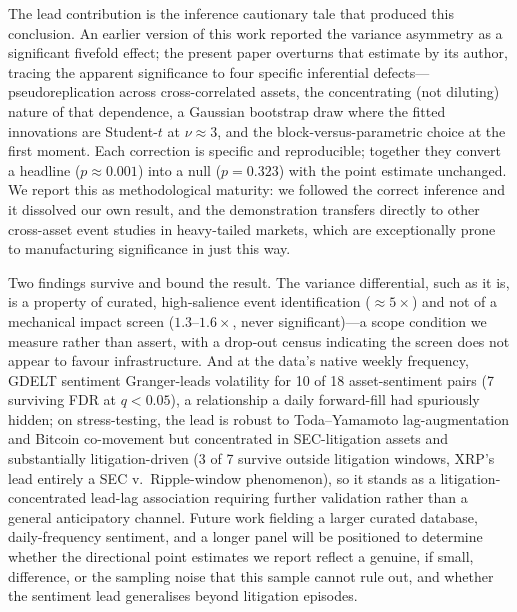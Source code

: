 \documentclass[pdflatex,sn-mathphys-num]{sn-jnl}
\theoremstyle{thmstyleone}
\theoremstyle{thmstyletwo}
\theoremstyle{thmstylethree}
\begin{document}
The lead contribution is the inference cautionary tale that produced this conclusion. An earlier version of this work reported the variance asymmetry as a significant fivefold effect; the present paper overturns that estimate by its author, tracing the apparent significance to four specific inferential defects---pseudoreplication across cross-correlated assets, the concentrating (not diluting) nature of that dependence, a Gaussian bootstrap draw where the fitted innovations are Student-$t$ at $\nu\approx 3$, and the block-versus-parametric choice at the first moment. Each correction is specific and reproducible; together they convert a headline ($p\approx 0.001$) into a null ($p=0.323$) with the point estimate unchanged. We report this as methodological maturity: we followed the correct inference and it dissolved our own result, and the demonstration transfers directly to other cross-asset event studies in heavy-tailed markets, which are exceptionally prone to manufacturing significance in just this way.

Two findings survive and bound the result. The variance differential, such as it is, is a property of curated, high-salience event identification ($\approx 5\times$) and not of a mechanical impact screen ($1.3$--$1.6\times$, never significant)---a scope condition we measure rather than assert, with a drop-out census indicating the screen does not appear to favour infrastructure. And at the data's native weekly frequency, GDELT sentiment Granger-leads volatility for 10 of 18 asset-sentiment pairs (7 surviving FDR at $q<0.05$), a relationship a daily forward-fill had spuriously hidden; on stress-testing, the lead is robust to Toda--Yamamoto lag-augmentation and Bitcoin co-movement but concentrated in SEC-litigation assets and substantially litigation-driven (3 of 7 survive outside litigation windows, XRP's lead entirely a SEC v.\ Ripple-window phenomenon), so it stands as a litigation-concentrated lead-lag association requiring further validation rather than a general anticipatory channel. Future work fielding a larger curated database, daily-frequency sentiment, and a longer panel will be positioned to determine whether the directional point estimates we report reflect a genuine, if small, difference, or the sampling noise that this sample cannot rule out, and whether the sentiment lead generalises beyond litigation episodes.

\end{document}
